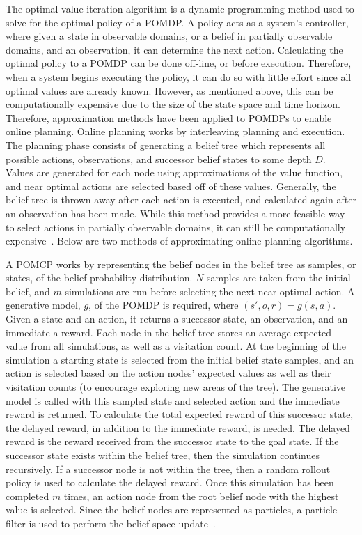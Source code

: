 \documentclass[12pt]{article}
\begin{document}
The optimal value iteration algorithm is a dynamic programming method used to solve for the optimal policy of a POMDP. A policy acts as a system's controller, where given a state in observable domains, or a belief in partially observable domains, and an observation, it can determine the next action. Calculating the optimal policy to a POMDP can be done off-line, or before execution. Therefore, when a system begins executing the policy, it can do so with little effort since all optimal values are already known. However, as mentioned above, this can be computationally expensive due to the size of the state space and time horizon. Therefore, approximation methods have been applied to POMDPs to enable online planning. Online planning works by interleaving planning and execution. The planning phase consists of generating a belief tree which represents all possible actions, observations, and successor belief states to some depth $D$. Values are generated for each node using approximations of the value function, and near optimal actions are selected based off of these values. Generally, the belief tree is thrown away after each action is executed, and calculated again after an observation has been made. While this method provides a more feasible way to select actions in partially observable domains, it can still be computationally expensive~\cite{ross_online_2008}. Below are two methods of approximating online planning algorithms.

A POMCP works by representing the belief nodes in the belief tree as samples, or states, of the belief probability distribution. $N$ samples are taken from the initial belief, and $m$ simulations are run before selecting the next near-optimal action. A generative model, $g$, of the POMDP is required, where $(s', o, r) = g(s, a)$. Given a state and an action, it returns a successor state, an observation, and an immediate a reward. Each node in the belief tree stores an average expected value from all simulations, as well as a visitation count. At the beginning of the simulation a starting state is selected from the initial belief state samples, and an action is selected based on the action nodes' expected values as well as their visitation counts (to encourage exploring new areas of the tree). The generative model is called with this sampled state and selected action and the immediate reward is returned. To calculate the total expected reward of this successor state, the delayed reward, in addition to the immediate reward, is needed. The delayed reward is the reward received from the successor state to the goal state. If the successor state exists within the belief tree, then the simulation continues recursively. If a successor node is not within the tree, then a random rollout policy is used to calculate the delayed reward. Once this simulation has been completed $m$ times, an action node from the root belief node with the highest value is selected. Since the belief nodes are represented as particles, a particle filter is used to perform the belief space update~\cite{silver_monte-carlo_2010}.
\end{document}
